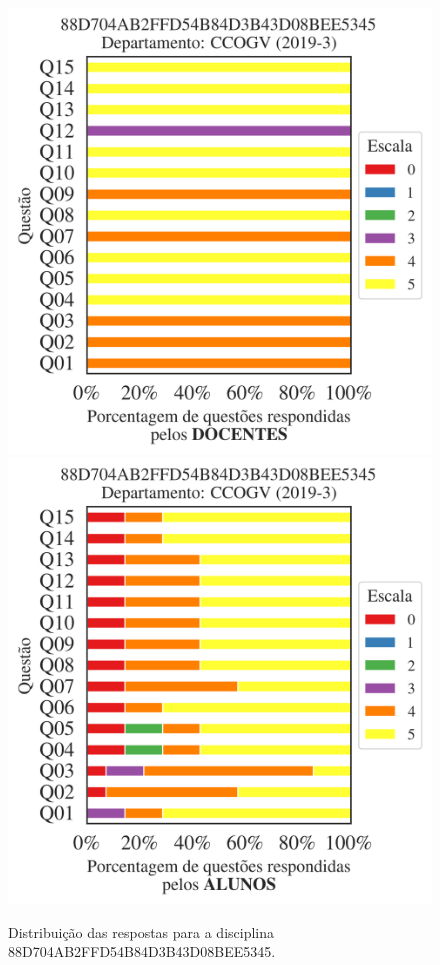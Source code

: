 \documentclass[a4paper,10pt]{article}
\begin{document}
\begin{figure}[h]
\centering
\includegraphics[width=0.485\linewidth]{analise_disciplina_departamento_CCOGV_88D704AB2FFD54B84D3B43D08BEE5345_docentes.png}
\includegraphics[width=0.485\linewidth]{analise_disciplina_departamento_CCOGV_88D704AB2FFD54B84D3B43D08BEE5345_alunos.png}
\caption{\label{fig:analise_geral_departamento}                Distribuição das respostas para a disciplina 88D704AB2FFD54B84D3B43D08BEE5345. }
\end{figure}
\end{document}
